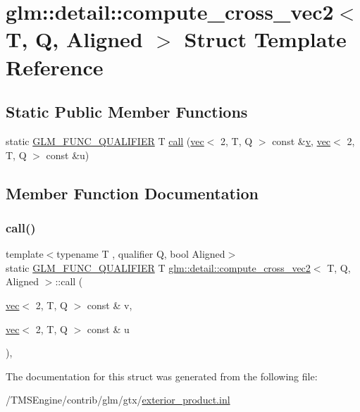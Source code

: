 \hypertarget{structglm_1_1detail_1_1compute__cross__vec2}{}\section{glm\+:\+:detail\+:\+:compute\+\_\+cross\+\_\+vec2$<$ T, Q, Aligned $>$ Struct Template Reference}
\label{structglm_1_1detail_1_1compute__cross__vec2}
\subsection*{Static Public Member Functions}
\begin{DoxyCompactItemize}
\item 
static \hyperlink{setup_8hpp_a33fdea6f91c5f834105f7415e2a64407}{G\+L\+M\+\_\+\+F\+U\+N\+C\+\_\+\+Q\+U\+A\+L\+I\+F\+I\+ER} T \hyperlink{structglm_1_1detail_1_1compute__cross__vec2_a97f072d3e14a20f16871c54d74a6096a}{call} (\hyperlink{structglm_1_1vec}{vec}$<$ 2, T, Q $>$ const \&\hyperlink{_s_d_l__opengl_8h_a10a82eabcb59d2fcd74acee063775f90}{v}, \hyperlink{structglm_1_1vec}{vec}$<$ 2, T, Q $>$ const \&u)
\end{DoxyCompactItemize}


\subsection{Member Function Documentation}
\mbox{\label{structglm_1_1detail_1_1compute__cross__vec2_a97f072d3e14a20f16871c54d74a6096a}} 
\subsubsection{\texorpdfstring{call()}{call()}}
{\footnotesize\ttfamily template$<$typename T , qualifier Q, bool Aligned$>$ \\
static \hyperlink{setup_8hpp_a33fdea6f91c5f834105f7415e2a64407}{G\+L\+M\+\_\+\+F\+U\+N\+C\+\_\+\+Q\+U\+A\+L\+I\+F\+I\+ER} T \hyperlink{structglm_1_1detail_1_1compute__cross__vec2}{glm\+::detail\+::compute\+\_\+cross\+\_\+vec2}$<$ T, Q, Aligned $>$\+::call (\begin{DoxyParamCaption}\item[{\hyperlink{structglm_1_1vec}{vec}$<$ 2, T, Q $>$ const \&}]{v,  }\item[{\hyperlink{structglm_1_1vec}{vec}$<$ 2, T, Q $>$ const \&}]{u }\end{DoxyParamCaption})\hspace{0.3cm}{\ttfamily [inline]}, {\ttfamily [static]}}



The documentation for this struct was generated from the following file\+:\begin{DoxyCompactItemize}
\item 
/\+T\+M\+S\+Engine/contrib/glm/gtx/\hyperlink{exterior__product_8inl}{exterior\+\_\+product.\+inl}\end{DoxyCompactItemize}
